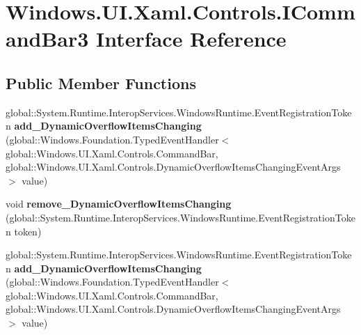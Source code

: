 \hypertarget{interface_windows_1_1_u_i_1_1_xaml_1_1_controls_1_1_i_command_bar3}{}\section{Windows.\+U\+I.\+Xaml.\+Controls.\+I\+Command\+Bar3 Interface Reference}
\label{interface_windows_1_1_u_i_1_1_xaml_1_1_controls_1_1_i_command_bar3}
\subsection*{Public Member Functions}
\begin{DoxyCompactItemize}
\item 
\mbox{\label{interface_windows_1_1_u_i_1_1_xaml_1_1_controls_1_1_i_command_bar3_abe3fd048f4c552dbed19dd3e2e6e563d}} 
global\+::\+System.\+Runtime.\+Interop\+Services.\+Windows\+Runtime.\+Event\+Registration\+Token {\bfseries add\+\_\+\+Dynamic\+Overflow\+Items\+Changing} (global\+::\+Windows.\+Foundation.\+Typed\+Event\+Handler$<$ global\+::\+Windows.\+U\+I.\+Xaml.\+Controls.\+Command\+Bar, global\+::\+Windows.\+U\+I.\+Xaml.\+Controls.\+Dynamic\+Overflow\+Items\+Changing\+Event\+Args $>$ value)
\item 
\mbox{\label{interface_windows_1_1_u_i_1_1_xaml_1_1_controls_1_1_i_command_bar3_a45e56795c020f83b9e93caf640a4736b}} 
void {\bfseries remove\+\_\+\+Dynamic\+Overflow\+Items\+Changing} (global\+::\+System.\+Runtime.\+Interop\+Services.\+Windows\+Runtime.\+Event\+Registration\+Token token)
\item 
\mbox{\label{interface_windows_1_1_u_i_1_1_xaml_1_1_controls_1_1_i_command_bar3_abe3fd048f4c552dbed19dd3e2e6e563d}} 
global\+::\+System.\+Runtime.\+Interop\+Services.\+Windows\+Runtime.\+Event\+Registration\+Token {\bfseries add\+\_\+\+Dynamic\+Overflow\+Items\+Changing} (global\+::\+Windows.\+Foundation.\+Typed\+Event\+Handler$<$ global\+::\+Windows.\+U\+I.\+Xaml.\+Controls.\+Command\+Bar, global\+::\+Windows.\+U\+I.\+Xaml.\+Controls.\+Dynamic\+Overflow\+Items\+Changing\+Event\+Args $>$ value)
\item 
\mbox{\label{interface_windows_1_1_u_i_1_1_xaml_1_1_controls_1_1_i_command_bar3_a45e56795c020f83b9e93caf640a4736b}} 

\end{DoxyCompactItemize}

